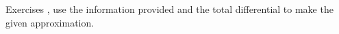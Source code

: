 {\noindent Exercises}
{, use the information provided and the total differential to make the given approximation.}
